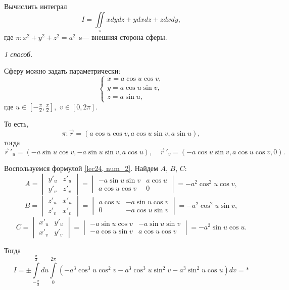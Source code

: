 \documentclass[../../main.tex]{subfiles}
\begin{document}
\begin{example}
	Вычислить интеграл \[I = \iint\limits_\pi xdydz + ydxdz + zdxdy,\] где $\pi:
	 x^2 + y^2 + z^2 = a^2$~s--- внешняя сторона сферы.
	\smallskip
	
	\noindent\emph{1 способ.}
		
	Сферу можно задать параметрически:
	\[\begin{cases}	x = a \cos u \cos v,\\
		y = a \cos u \sin v,\\
		z = a \sin u,
	\end{cases}\]
	где $u \in [-\frac{\pi}{2}, \frac{\pi}{2}],$ $v \in [0, 2\pi].$
	
	То есть, \[\pi: \vec{r} = ( a \cos u \cos v,  a \cos u \sin v, a \sin u),\] 
	тогда \[\vec r\,'_u = (-a \sin u \cos v, -a \sin u \sin v, a \cos u),\quad
	 \vec r\,'_v = (-a \cos u \sin v, a \cos u \cos v, 0).\]
	
	Воспользуемся формулой \eqref{lec24, num_2}. Найдем $A$, $B$, $C$: 
	\[A=\begin{vmatrix}
	y'_u & z'_u\\
	y'_v & z'_v
	\end{vmatrix} = \begin{vmatrix}
	-a \sin u \sin v & a \cos u\\
	 a \cos u \cos v & 0
	\end{vmatrix} = -a^2 \cos^2 u \cos v,\] \[B=\begin{vmatrix}
	z'_u & x'_u\\
	z'_v & x'_v
	\end{vmatrix} = \begin{vmatrix}
	a \cos u & -a \sin u \cos v\\
	0 & -a \cos u \sin v
	\end{vmatrix} = -a^2 \cos^2 u \sin v,\]
	\begin{equation}C=\begin{vmatrix}
	x'_u & y'_u\\
	x'_v & y'_v
	\end{vmatrix} = \begin{vmatrix}
	-a \sin u \cos v & -a \sin u \sin v\\
	-a \cos u \sin v & a \cos u \cos v
	\end{vmatrix} = -a^2 \sin u \cos u.
	\label{lec24, num_2.5}
	\end{equation}
	
	Тогда \[I = \pm\int\limits_{-\frac{\pi}{2}}^{\frac{\pi}{2}}du\int\limits_0^
	{2\pi}(-a^3\cos^3 u \cos^2 v - a^3\cos^3 u \sin^2 v - a^3\sin^2 u \cos u)dv
	 = *\]
	

\end{example}
\end{document}
